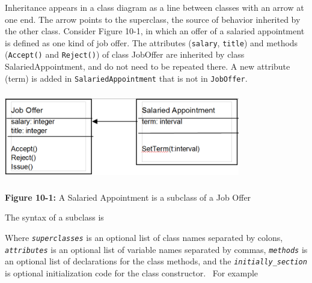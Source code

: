 Inheritance appears in a class diagram as a line between classes with an
arrow at one end. The arrow points to the superclass, the source of
behavior inherited by the other class. Consider Figure 10-1, in which
an offer of a salaried appointment is defined as one kind of job offer.
The attributes (\texttt{salary}, \texttt{title}) and methods
(\texttt{Accept()} and \texttt{Reject()}) of class JobOffer are
inherited by class SalariedAppointment, and do not need to be repeated
there. A new attribute (term) is added in \texttt{SalariedAppointment}
that is not in \texttt{JobOffer}.

\begin{center}
\includegraphics[width=4.05in,height=1.52in]{ub-img/subclass.png} 

{\sffamily\bfseries Figure 10-1:}
{\sffamily A Salaried Appointment is a subclass of a Job Offer}
\end{center}

\noindent
The syntax of a subclass is 


Where \texttt{\textit{superclasses}} is an optional list of class names
separated by colons, \texttt{\textit{attributes}} is an optional list
of variable names separated by commas,
\texttt{\textit{methods}} is an optional list of declarations for the
class methods, and the \texttt{\textit{initially\_section}} is optional
initialization code for the class constructor. \ For
example


